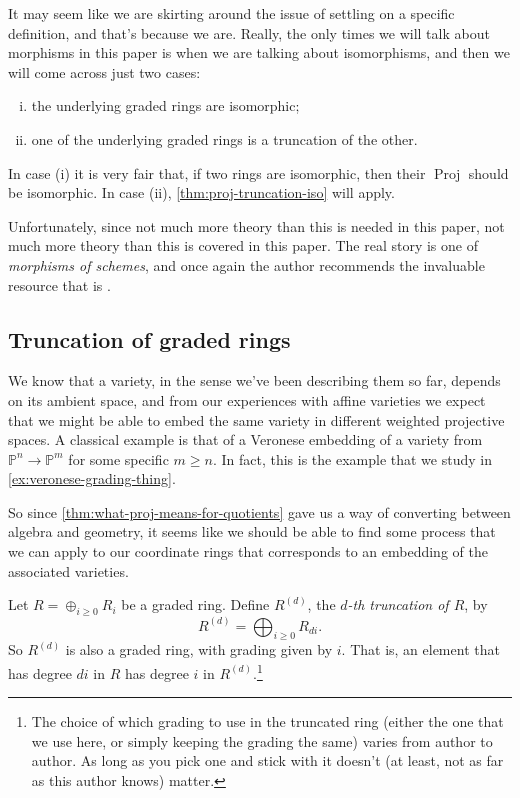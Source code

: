 \documentclass[10pt,notitlepage]{article}
\numberwithin{equation}{subsection}
\DeclareMathOperator{\proj}{Proj}
\newcommand{\pee}{\mathbb{P}}
\begin{document}
    It may seem like we are skirting around the issue of settling on a specific definition, and that's because we are.
    Really, the only times we will talk about morphisms in this paper is when we are talking about isomorphisms, and then we will come across just two cases:
    \begin{enumerate}[(i)]
        \item the underlying graded rings are isomorphic;
        \item one of the underlying graded rings is a truncation of the other.
    \end{enumerate}
    In case (i) it is very fair that, if two rings are isomorphic, then their $\proj$ should be isomorphic.
    In case (ii), \cref{thm:proj-truncation-iso} will apply.

    Unfortunately, since not much more theory than this is needed in this paper, not much more theory than this is covered in this paper.
    The real story is one of \emph{morphisms of schemes}, and once again the author recommends the invaluable resource that is \cite[Chapter~II]{Hartshorne:1977we}.
    



    \subsection{Truncation of graded rings} %
    \label{sub:truncation_of_graded_rings}

    We know that a variety, in the sense we've been describing them so far, depends on its ambient space, and from our experiences with affine varieties we expect that we might be able to embed the same variety in different weighted projective spaces.
    A classical example is that of a Veronese embedding of a variety from $\pee^n\to\pee^m$ for some specific $m\geqslant n$.
    In fact, this is the example that we study in \cref{ex:veronese-grading-thing}.

    So since \cref{thm:what-proj-means-for-quotients} gave us a way of converting between algebra and geometry, it seems like we should be able to find some process that we can apply to our coordinate rings that corresponds to an embedding of the associated varieties.

    \begin{definition}\label{defn:truncation-of-graded-ring}
        Let $R=\oplus_{i\geqslant0}R_i$ be a graded ring.
        Define $R^{(d)}$, the \emph{$d$-th truncation of $R$}, by
        \[
            R^{(d)} = \bigoplus_{i\geqslant0}R_{di}.
        \]
        So $R^{(d)}$ is also a graded ring, with grading given by $i$.
        That is, an element that has degree $di$ in $R$ has degree $i$ in $R^{(d)}$.\footnote{%
            The choice of which grading to use in the truncated ring (either the one that we use here, or simply keeping the grading the same) varies from author to author.
            As long as you pick one and stick with it doesn't (at least, not as far as this author knows) matter.
        }
    \end{definition}
\end{document}
